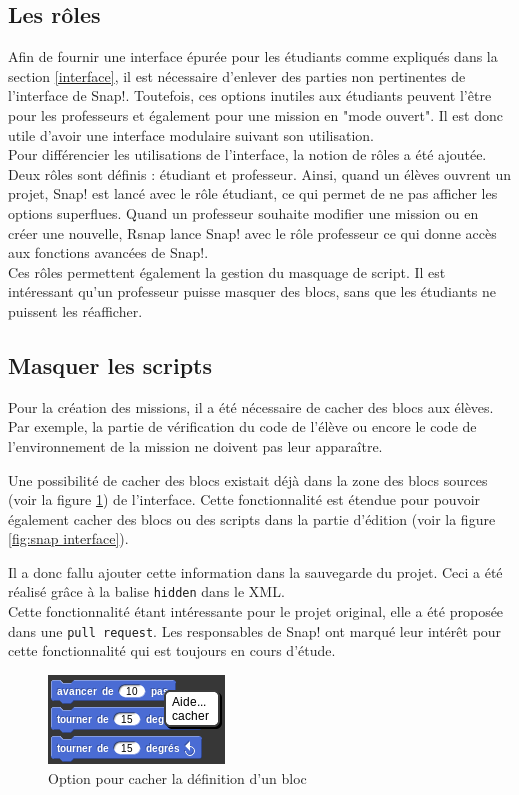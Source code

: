 \subsection{Les rôles}
\label{role}
Afin de fournir une interface épurée pour les étudiants comme expliqués dans la section \ref{interface}, il est nécessaire d'enlever des parties non pertinentes de l'interface de Snap!. Toutefois, ces options inutiles aux étudiants peuvent l'être pour les professeurs et également pour une mission en "mode ouvert". Il est donc utile d'avoir une interface modulaire suivant son utilisation. \\

Pour différencier les utilisations de l'interface, la notion de rôles a été ajoutée. Deux rôles sont définis : étudiant et professeur. Ainsi, quand un élèves ouvrent un projet, Snap! est lancé avec le rôle étudiant, ce qui permet de ne pas afficher les options superflues. Quand un professeur souhaite modifier une mission ou en créer une nouvelle, \gls{Rsnap} lance Snap! avec le rôle professeur ce qui donne accès aux fonctions avancées de Snap!.\\

Ces rôles permettent également la gestion du masquage de script. Il est intéressant qu'un professeur puisse masquer des blocs, sans que les étudiants ne puissent les réafficher.

\subsection{Masquer les scripts}
Pour la création des missions, il a été nécessaire de cacher des blocs aux élèves. Par exemple, la partie de vérification du code de l'élève ou encore le code de l'environnement de la mission ne doivent pas leur apparaître.

Une possibilité de cacher des blocs existait déjà dans la zone des blocs sources (voir la figure \ref{fig:cacher}) de l'interface. Cette fonctionnalité est étendue pour pouvoir également cacher des blocs ou des scripts dans la partie d'édition (voir la figure \ref{fig:snap interface}).

Il a donc fallu ajouter cette information dans la sauvegarde du projet. Ceci a été réalisé grâce à la balise \texttt{hidden} dans le XML.\\


Cette fonctionnalité étant intéressante pour le projet original, elle a été proposée dans une \texttt{pull request}. Les responsables de Snap! ont marqué leur intérêt pour cette fonctionnalité qui est toujours en cours d'étude.
\begin{figure}
  \begin{center}
    \includegraphics[scale=0.5]{content/7-solution/2-snap/images/cacher}
    \caption{Option pour cacher la définition d'un bloc}
    \label{fig:cacher}
  \end{center}
\end{figure}

